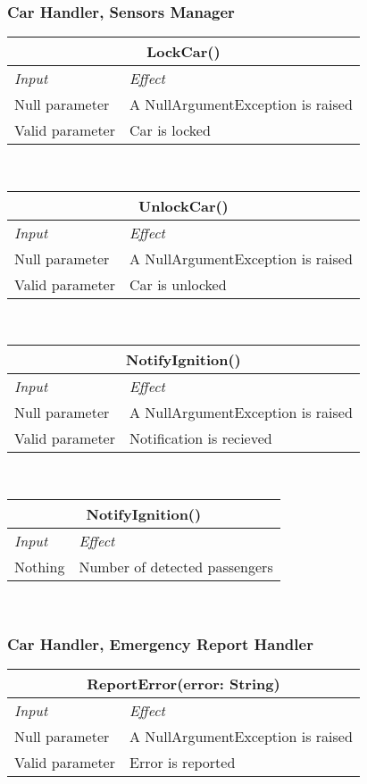 			\subsubsection*{Car Handler, Sensors Manager} 
			\begin{tabular}{ |l|l| }
				\hline
				\multicolumn{2}{|c|}{LockCar()}\\
				\hline
				\textit{Input}&\textit{Effect}\\ \hline
				Null parameter & A NullArgumentException is raised\\ \hline
				Valid parameter & Car is locked  \\ \hline
			\end{tabular}
			\\
			\begin{tabular}{ |l|l| }
				\hline
				\multicolumn{2}{|c|}{UnlockCar()}\\
				\hline
				\textit{Input}&\textit{Effect}\\ \hline
				Null parameter & A NullArgumentException is raised\\ \hline
				Valid parameter & Car is unlocked  \\ \hline
			\end{tabular}
			\\
			\begin{tabular}{ |l|l| }
				\hline
				\multicolumn{2}{|c|}{NotifyIgnition()}\\
				\hline
				\textit{Input}&\textit{Effect}\\ \hline
				Null parameter & A NullArgumentException is raised\\ \hline
				Valid parameter & Notification is recieved  \\ \hline
			\end{tabular}
			\\
			\begin{tabular}{ |l|l| }
				\hline
				\multicolumn{2}{|c|}{NotifyIgnition()}\\
				\hline
				\textit{Input}&\textit{Effect}\\ \hline
				Nothing & Number of detected passengers  \\ \hline
			\end{tabular}
			\\
			
			\subsubsection*{Car Handler, Emergency Report Handler} %
			\begin{tabular}{ |l|l| }
				\hline
				\multicolumn{2}{|c|}{ReportError(error: String)}\\
				\hline
				\textit{Input}&\textit{Effect}\\ \hline
				Null parameter & A NullArgumentException is raised\\ \hline
				Valid parameter &  Error is reported \\ \hline
			\end{tabular}
			\\
			
			
			
			
			
				
			
			
			
			
			
			
			
			
			